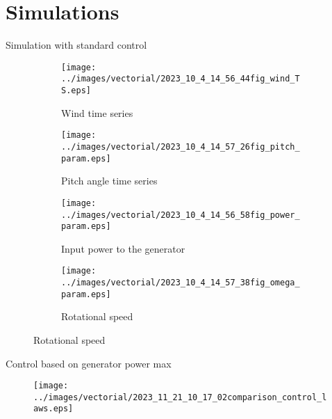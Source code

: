 \section{Simulations}
\begin{frame}{Simulation with standard control}
  \begin{figure}[!htbp]
    \begin{subfigure}{0.49\columnwidth}
      \centering
      \texttt{[image: ../images/vectorial/2023\_10\_4\_14\_56\_44fig\_wind\_TS.eps]}
      \caption{Wind time series}
    \end{subfigure}
    \begin{subfigure}{0.49\columnwidth}
      \centering
      \texttt{[image: ../images/vectorial/2023\_10\_4\_14\_57\_26fig\_pitch\_param.eps]}
      \caption{Pitch angle time series}
    \end{subfigure}
    \begin{subfigure}{0.49\columnwidth}
      \centering
      \texttt{[image: ../images/vectorial/2023\_10\_4\_14\_56\_58fig\_power\_param.eps]}
      \caption{Input power to the generator}
    \end{subfigure}
    \begin{subfigure}{0.49\columnwidth}
      \centering
      \texttt{[image: ../images/vectorial/2023\_10\_4\_14\_57\_38fig\_omega\_param.eps]}
      \caption{Rotational speed}
    \end{subfigure}
  \end{figure}
\end{frame}

\begin{frame}{Control based on generator power max}
  \begin{figure}
    \centering
    \texttt{[image: ../images/vectorial/2023\_11\_21\_10\_17\_02comparison\_control\_laws.eps]}
  \end{figure}
\end{frame}

